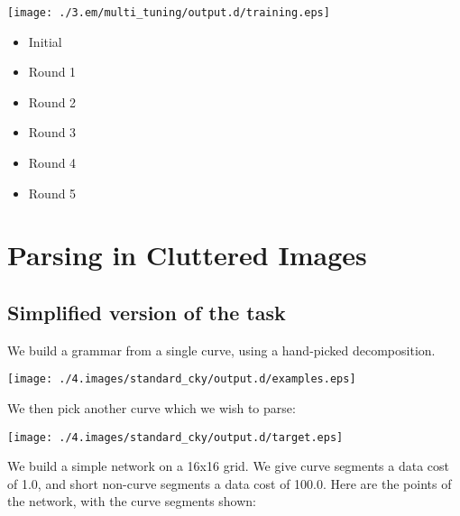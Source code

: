 \documentclass{book}
\begin{document}
\texttt{[image: ./3.em/multi\_tuning/output.d/training.eps]}
\begin{itemize}

\item Initial\\
\label{sec-2_4_2_1}%


\item Round 1\\
\label{sec-2_4_2_2}%


\item Round 2\\
\label{sec-2_4_2_3}%


\item Round 3\\
\label{sec-2_4_2_4}%


\item Round 4\\
\label{sec-2_4_2_5}%


\item Round 5\\
\label{sec-2_4_2_6}%






\end{itemize} %
\section{Parsing in Cluttered Images}
\label{sec-2_5}
\subsection{Simplified version of the task}
\label{sec-2_5_1}


We build a grammar from a single curve, using a hand-picked
decomposition.

\texttt{[image: ./4.images/standard\_cky/output.d/examples.eps]}

We then pick another curve which we wish to parse:

\texttt{[image: ./4.images/standard\_cky/output.d/target.eps]}

We build a simple network on a 16x16 grid. We give curve segments a
data cost of 1.0, and short non-curve segments a data cost of 100.0.
Here are the points of the network, with the curve segments shown:
\end{document}
